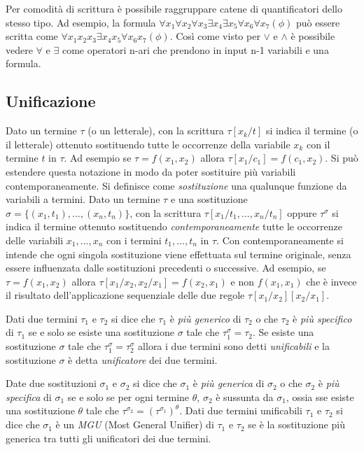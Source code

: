 \documentclass[./main.tex]{subfiles}
\begin{document}
Per comodità di scrittura è possibile raggruppare catene di quantificatori dello stesso tipo. Ad esempio, la formula 
$ \forall x_1 \forall x_2 \forall x_3 \exists x_4 \exists x_5 \forall x_6 \forall x_7 (\phi)$ può essere scritta come 
$\forall x_1 x_2 x_3 \exists x_4 x_5 \forall x_6 x_7 (\phi)$. Così come visto per $\lor$ e $\land$ è possibile vedere
$\forall$ e $\exists$ come operatori n-ari che prendono in input n-1 variabili e una formula.



\subsection{Unificazione}
Dato un termine $\tau$ (o un letterale), con la scrittura $\tau[x_k/t]$ si indica il termine (o il letterale) ottenuto sostituendo
tutte le occorrenze della variabile $x_k$ con il termine $t$ in $\tau$. Ad esempio se $\tau = f(x_1, x_2)$ allora $\tau[x_1/c_1] = f(c_1, x_2)$.
Si può estendere questa notazione in modo da poter sostituire più variabili contemporaneamente. 
Si definisce come \textit{sostituzione} una qualunque funzione da variabili a termini.
Dato un termine $\tau$ e una sostituzione $\sigma = \{(x_1, t_1), ..., (x_n, t_n)\}$,
con la scrittura $\tau[x_1/t_1, ..., x_n/t_n]$ oppure $\tau^\sigma$ si indica il termine ottenuto sostituendo \textit{contemporaneamente} 
tutte le occorrenze delle variabili $x_1, ..., x_n$ con i termini $t_1, ..., t_n$ in $\tau$.
Con contemporaneamente si intende che ogni singola sostituzione viene effettuata sul termine originale, 
senza essere influenzata dalle sostituzioni precedenti o successive.
Ad esempio, se $\tau = f(x_1, x_2)$ allora $\tau[x_1/x_2, x_2/x_1] = f(x_2, x_1)$ e non $f(x_1, x_1)$ 
che è invece il risultato dell'applicazione sequenziale delle due regole $\tau[x_1/x_2][x_2/x_1]$.

Dati due termini $\tau_1$ e $\tau_2$ si dice che $\tau_1$ è \textit{più generico} di $\tau_2$ o che $\tau_2$ è \textit{più specifico} di $\tau_1$
se e solo se esiste una sostituzione $\sigma$ tale che $\tau_1^\sigma = \tau_2$.
Se esiste una sostituzione $\sigma$ tale che $\tau_1^\sigma = \tau_2^\sigma$ allora i due termini sono detti \textit{unificabili} e 
la sostituzione $\sigma$ è detta \textit{unificatore} dei due termini.


Date due sostituzioni $\sigma_1$ e $\sigma_2$ si dice che $\sigma_1$ 
è \textit{più generica} di $\sigma_2$ o che $\sigma_2$ è \textit{più specifica} di $\sigma_1$ se e solo se 
per ogni termine $\theta$, $\sigma_2$ è sussunta da $\sigma_1$, 
ossia sse esiste una sostituzione $\theta$ tale che $\tau^{\sigma_2} = {(\tau^{\sigma_1})}^\theta$.
Dati due termini unificabili $\tau_1$ e $\tau_2$ si dice che $\sigma_1$ è un \textit{MGU} (Most General Unifier) di $\tau_1$ e $\tau_2$ 
se è la sostituzione più generica tra tutti gli unificatori dei due termini.
\end{document}
